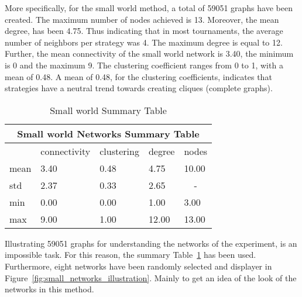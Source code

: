 More specifically, for the small world method, a total of 59051 graphs have
been created. The maximum number of nodes achieved is 13. Moreover, the
mean degree, has been 4.75. Thus indicating that
in most tournaments, the average number of neighbors per strategy was 4.
The maximum degree is equal to 12. Further,
the mean connectivity of the small world network is 3.40, the minimum is 0 and the maximum 9.
The clustering coefficient ranges from 0 to 1, with a mean of 0.48. A mean
of 0.48, for the clustering coefficients, indicates that strategies have a
neutral trend towards creating cliques (complete graphs).

\begin{table}[!hbtp]
	\centering
	\begin{adjustbox}{width=0.5\textwidth}
		\small
		\begin{tabular}{|l|l|l|l|l|}
			\hline
			\multicolumn{5}{|c|}{Small world Networks Summary Table}           \\ \hline
			     & connectivity & clustering & degree & nodes                  \\ \hline
			mean & 3.40         & 0.48       & 4.75   & 10.00                  \\ \hline
			std  & 2.37         & 0.33       & 2.65   & \multicolumn{1}{c|}{-} \\ \hline
			min  & 0.00         & 0.00       & 1.00   & 3.00                   \\ \hline
			max  & 9.00         & 1.00       & 12.00  & 13.00                  \\ \hline
		\end{tabular}
	\end{adjustbox}
	\caption{Small world Summary Table}
	\label{table:small-world-summary-table}
\end{table}

Illustrating 59051 graphs for understanding the networks of the experiment, is
an impossible task. For this reason, the summary Table~\ref{table:small-world-summary-table}
has been used. Furthermore, eight networks have been randomly selected and
displayer in Figure~\ref{fig:small_networks_illustration}. Mainly to get an idea
of the look of the networks in this method.

